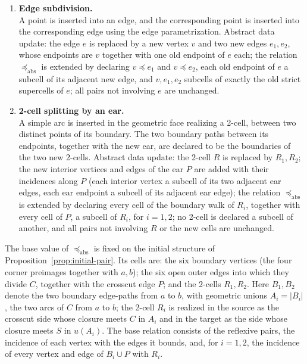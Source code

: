 \documentclass[11pt]{article}
\theoremstyle{mainplain}
\theoremstyle{mainroman}
\theoremstyle{definition}
\numberwithin{equation}{section}
\begin{document}
\begin{enumerate}
\def\labelenumi{\arabic{enumi}.}
\item
  \textbf{Edge subdivision.}\\
  A point is inserted into an edge, and the corresponding point is inserted into the corresponding edge using the edge parametrization. Abstract data update: the edge \(e\) is replaced by a new vertex \(v\) and two new edges \(e_1,e_2\), whose endpoints are \(v\) together with one old endpoint of \(e\) each; the relation \(\preceq_{\mathrm{abs}}\) is extended by declaring \(v\preceq e_1\) and \(v\preceq e_2\), each old endpoint of \(e\) a subcell of its adjacent new edge, and \(v,e_1,e_2\) subcells of exactly the old strict supercells of \(e\); all pairs not involving \(e\) are unchanged.
\item
  \textbf{2-cell splitting by an ear.}\\
  A simple arc is inserted in the geometric face realizing a 2-cell, between two distinct points of its boundary. The two boundary paths between its endpoints, together with the new ear, are declared to be the boundaries of the two new 2-cells. Abstract data update: the 2-cell \(R\) is replaced by \(R_1,R_2\); the new interior vertices and edges of the ear \(P\) are added with their incidences along \(P\) (each interior vertex a subcell of its two adjacent ear edges, each ear endpoint a subcell of its adjacent ear edge); the relation \(\preceq_{\mathrm{abs}}\) is extended by declaring every cell of the boundary walk of \(R_i\), together with every cell of \(P\), a subcell of \(R_i\), for \(i=1,2\); no 2-cell is declared a subcell of another, and all pairs not involving \(R\) or the new cells are unchanged.
\end{enumerate}

The base value of \(\preceq_{\mathrm{abs}}\) is fixed on the initial
structure of Proposition~\ref{prop:initial-pair}. Its cells are: the
six boundary vertices (the four corner preimages together with
\(a,b\)); the six open outer edges into which they divide \(C\),
together with the crosscut edge \(P\); and the 2-cells \(R_1,R_2\).
Here \(B_1,B_2\) denote the two boundary edge-paths from \(a\) to
\(b\), with geometric unions \(A_i=|B_i|\), the two arcs of \(C\) from
\(a\) to \(b\); the 2-cell \(R_i\) is realized in the source as the
crosscut side whose closure meets \(C\) in \(A_i\) and in the target
as the side whose closure meets \(S\) in \(u(A_i)\). The base relation
consists of the reflexive pairs, the incidence of each vertex with the
edges it bounds, and, for \(i=1,2\), the incidence of every vertex and
edge of \(B_i\cup P\) with \(R_i\).
\end{document}
